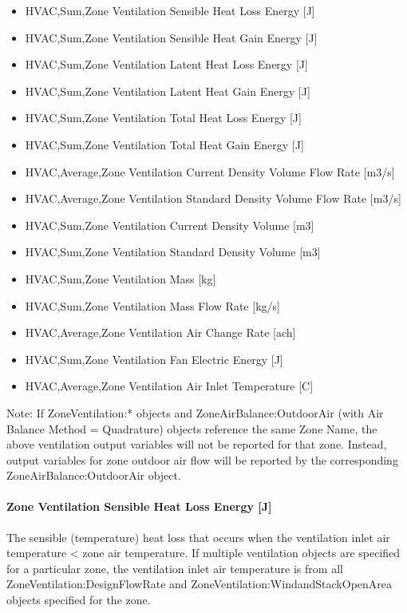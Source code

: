 \begin{itemize}
\item
  HVAC,Sum,Zone Ventilation Sensible Heat Loss Energy {[}J{]}
\item
  HVAC,Sum,Zone Ventilation Sensible Heat Gain Energy {[}J{]}
\item
  HVAC,Sum,Zone Ventilation Latent Heat Loss Energy {[}J{]}
\item
  HVAC,Sum,Zone Ventilation Latent Heat Gain Energy {[}J{]}
\item
  HVAC,Sum,Zone Ventilation Total Heat Loss Energy {[}J{]}
\item
  HVAC,Sum,Zone Ventilation Total Heat Gain Energy {[}J{]}
\item
  HVAC,Average,Zone Ventilation Current Density Volume Flow Rate {[}m3/s{]}
\item
  HVAC,Average,Zone Ventilation Standard Density Volume Flow Rate {[}m3/s{]}
\item
  HVAC,Sum,Zone Ventilation Current Density Volume {[}m3{]}
\item
  HVAC,Sum,Zone Ventilation Standard Density Volume {[}m3{]}
\item
  HVAC,Sum,Zone Ventilation Mass {[}kg{]}
\item
  HVAC,Sum,Zone Ventilation Mass Flow Rate {[}kg/s{]}
\item
  HVAC,Average,Zone Ventilation Air Change Rate {[}ach{]}
\item
  HVAC,Sum,Zone Ventilation Fan Electric Energy {[}J{]}
\item
  HVAC,Average,Zone Ventilation Air Inlet Temperature {[}C{]}
\end{itemize}

Note: If ZoneVentilation:* objects and ZoneAirBalance:OutdoorAir (with Air Balance Method = Quadrature) objects reference the same Zone Name, the above ventilation output variables will not be reported for that zone. Instead, output variables for zone outdoor air flow will be reported by the corresponding ZoneAirBalance:OutdoorAir object.

\paragraph{Zone Ventilation Sensible Heat Loss Energy {[}J{]}}\label{zone-ventilation-sensible-heat-loss-energy-j}

The sensible (temperature) heat loss that occurs when the ventilation inlet air temperature \textless{} zone air temperature. If multiple ventilation objects are specified for a particular zone, the ventilation inlet air temperature is from all ZoneVentilation:DesignFlowRate and ZoneVentilation:WindandStackOpenArea objects specified for the zone.

